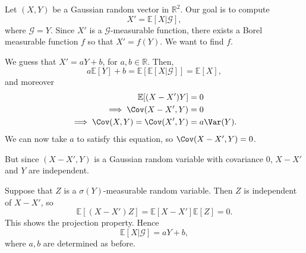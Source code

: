 \documentclass[12pt]{article}
\begin{document}
\begin{exbox}[Gaussians]
Let $(X, Y)$ be a Gaussian random vector in $\mathbb{R}^2$. Our goal is to compute
\[
X' = \mathbb{E}[X|\mathcal{G}],
\]
where $\mathcal{G} = Y$. Since $X'$ is a $\mathcal{G}$-measurable function, there exists a Borel measurable function $f$ so that $X' = f(Y)$. We want to find $f$.

We guess that $X' = aY + b$, for $a, b \in \mathbb{R}$. Then,
\[
a \mathbb{E}[Y] + b = \mathbb{E}[\mathbb{E}[X|\mathcal{G}]] = \mathbb{E}[X],
\]
and moreover
\begin{align*}
	\mathbb{E}[(X - X') Y] &= 0 \\
	\implies \Cov(X - X', Y) &= 0 \\
	\implies \Cov(X, Y) = \Cov(X', Y) &= a \Var(Y).
\end{align*}
We can now take $a$ to satisfy this equation, so $\Cov(X - X', Y) = 0$.

But since $(X - X', Y)$ is a Gaussian random variable with covariance $0$, $X - X'$ and $Y$ are independent.

Suppose that $Z$ is a $\sigma(Y)$-measurable random variable. Then $Z$ is independent of $X - X'$, so
\[
\mathbb{E}[(X - X')Z] = \mathbb{E}[X - X']\mathbb{E}[Z] = 0.
\]
This shows the projection property. Hence
\[
\mathbb{E}[X | \mathcal{G}] = aY + b,
\]
where $a, b$ are determined as before.
\end{exbox}
\end{document}
